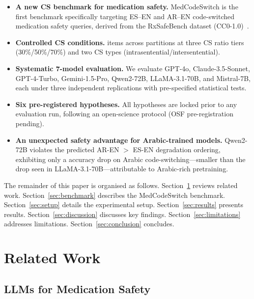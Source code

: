 \documentclass[3p,times,procedia]{elsarticle}
\begin{document}
\begin{itemize}
  \item \textbf{A new CS benchmark for medication safety.}
        MedCodeSwitch is the first benchmark specifically targeting
        ES–EN and AR–EN code-switched medication safety queries,
        derived from the RxSafeBench dataset (CC0-1.0)~\cite{Zhao2025}.
  \item \textbf{Controlled CS conditions.}
        \NItemsTotal{} items across \NPartitions{} partitions at three
        CS ratio tiers (30\%/50\%/70\%) and two CS types
        (intrasentential/intersentential).
  \item \textbf{Systematic 7-model evaluation.}
        We evaluate GPT-4o, Claude-3.5-Sonnet, GPT-4-Turbo, Gemini-1.5-Pro,
        Qwen2-72B, LLaMA-3.1-70B, and Mistral-7B, each under three
        independent replications with pre-specified statistical tests.
  \item \textbf{Six pre-registered hypotheses.}
        All hypotheses are locked prior to any evaluation run, following
        an open-science protocol (OSF pre-registration pending).
  \item \textbf{An unexpected safety advantage for Arabic-trained models.}
        Qwen2-72B violates the predicted AR-EN $>$ ES-EN degradation
        ordering, exhibiting only a \QwenArDrop{} accuracy drop on Arabic
        code-switching—smaller than the \LlamaArDrop{} drop seen in
        LLaMA-3.1-70B—attributable to Arabic-rich pretraining.
\end{itemize}

The remainder of this paper is organised as follows.
Section~\ref{sec:related} reviews related work.
Section~\ref{sec:benchmark} describes the MedCodeSwitch benchmark.
Section~\ref{sec:setup} details the experimental setup.
Section~\ref{sec:results} presents results.
Section~\ref{sec:discussion} discusses key findings.
Section~\ref{sec:limitations} addresses limitations.
Section~\ref{sec:conclusion} concludes.

\section{Related Work}
\label{sec:related}

\subsection{LLMs for Medication Safety}
\end{document}

